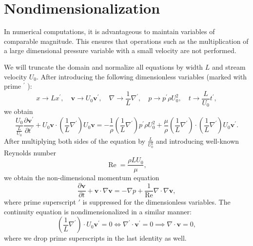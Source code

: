 \documentclass{article}
\numberwithin{equation}{section}
\begin{document}
\section{Nondimensionalization}\label{sec:nondimensionalization}
In numerical computations, it is advantageous to maintain variables of comparable magnitude. This ensures that operations such as the multiplication of a large dimensional pressure variable with a small velocity are not performed. 

We will truncate the domain and normalize all equations by width $L$ and stream velocity $U_0$. After introducing the following dimensionless variables (marked with prime ${ }^{\prime}$ ):
\begin{equation*}
	x\to Lx^{\prime},  \quad 
	\boldsymbol{v}\to U_0\boldsymbol{v}^{\prime}, \quad 
	\nabla\to \frac{1}{L}\nabla^{\prime}, \quad 
	p\to p^{\prime} \rho U_0^2, \quad 
	t\to \frac{L}{U_0}t^{\prime},
\end{equation*}
we obtain
\begin{equation*}
	\frac{U_0}{\frac{L}{U_0}} \frac{\partial \boldsymbol{v}^{\prime}}{\partial t^{\prime}}+U_0\boldsymbol{v}\cdot\left(\frac{1}{L} \nabla^{\prime}\right) U_0\boldsymbol{v}=-\frac{1}{\rho}\left(\frac{1}{L} \nabla^{\prime}\right){p^{\prime}\rho U^2_0}+\frac{\mu}{\rho} \left(\frac{1}{L} \nabla^{\prime}\right) \cdot\left(\frac{1}{L} \nabla^{\prime}\right) U_0\boldsymbol{v}^{\prime}.
\end{equation*}
After multiplying both sides of the equation by $\frac{L}{U_0^2}$ and introducing well-known Reynolds number 
\begin{equation*}
\operatorname{Re}=\frac{\rho L U_0}{\mu},
\end{equation*}
we obtain the non-dimensional momentum equation
\begin{equation*}
	\frac{\partial \boldsymbol{v}}{\partial t} + \boldsymbol{v} \cdot \nabla \boldsymbol{v} = -\nabla p + \frac{1}{\operatorname{Re}} \nabla \cdot \nabla \boldsymbol{v},
\end{equation*}
where prime superscript $\prime$ is suppressed for the dimensionless variables. The continuity equation is nondimensionalized in a similar manner:
\begin{equation*}
	\left(\frac{1}{L} \nabla^{\prime}\right) \cdot U_0\boldsymbol{v}^{\prime}=0\iff\nabla^{\prime} \cdot\boldsymbol{v}^{\prime}=0\implies\nabla \cdot\boldsymbol{v}=0,
\end{equation*}
where we drop prime superscripts in the last identity as well.
\end{document}
